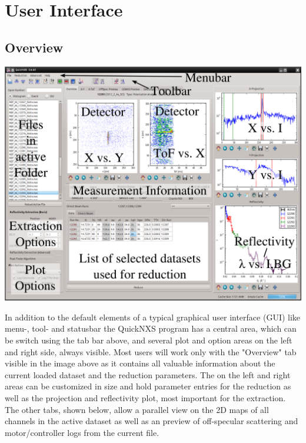 \chapter{User Interface}
\label{chap:user_interface}

\section{Overview}
\def\svgwidth{\textwidth}
\begin{LARGE}
\includegraphics[width=455pt]{screenshots/overview_labels.png} 
\end{LARGE}

In addition to the default elements of a typical graphical user interface (GUI) like menu-, tool- and statusbar the QuickNXS program has a central area, which can be switch using the tab bar above, and several plot and option areas on the left and right side, always visible. Most users will work only with the "Overview" tab visible in the image above as it contains all valuable information about the current loaded dataset and the reduction parameters. 
The on the left and right areas can be customized in size and hold parameter entries for the reduction as well as the projection and reflectivity plot, most important for the extraction.
The other tabs, shown below, allow a parallel view on the 2D maps of all channels in the active dataset as well as an preview of off-specular scattering and motor/controller logs from the current file.

